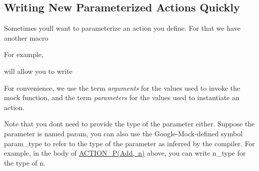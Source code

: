 \subsection*{Writing New Parameterized Actions Quickly}

Sometimes you\textquotesingle{}ll want to parameterize an action you define. For that we have another macro 
\begin{DoxyCode}{0}
\end{DoxyCode}


For example, 
\begin{DoxyCode}{0}
\end{DoxyCode}
 will allow you to write 
\begin{DoxyCode}{0}
\DoxyCodeLine{\textcolor{comment}{// Returns argument \#0 + 5.}}
\end{DoxyCode}


For convenience, we use the term {\itshape arguments} for the values used to invoke the mock function, and the term {\itshape parameters} for the values used to instantiate an action.

Note that you don\textquotesingle{}t need to provide the type of the parameter either. Suppose the parameter is named {\ttfamily param}, you can also use the Google-\/\+Mock-\/defined symbol {\ttfamily param\+\_\+type} to refer to the type of the parameter as inferred by the compiler. For example, in the body of {\ttfamily \mbox{\hyperlink{_obj__test_2lib_2googletest-release-1_88_81_2googlemock_2include_2gmock_2gmock-generated-actions_8h_a8ee9766f611f068271ca37a90c0e5960}{A\+C\+T\+I\+O\+N\+\_\+\+P(\+Add, n)}}} above, you can write {\ttfamily n\+\_\+type} for the type of {\ttfamily n}.

